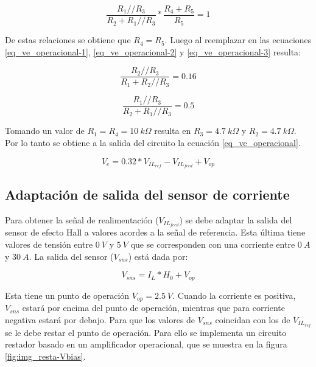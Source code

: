 \begin{equation} \label{eq_ve_operacional-3}
	\frac{R_{1}//R_{3}}{R_{2}+R_{1}//R_{3}}*\frac{R_{4}+R_{5}}{R_{5}} = 1
\end{equation}

De estas relaciones se obtiene que $R_{4}=R_{5}$. Luego al reemplazar en las ecuaciones \ref{eq_ve_operacional-1}, \ref{eq_ve_operacional-2} y \ref{eq_ve_operacional-3} resulta:

\begin{equation*}
	\frac{R_{2}//R_{3}}{R_{1}+R_{2}//R_{3}}= 0.16
\end{equation*}

\begin{equation*}
	\frac{R_{1}//R_{3}}{R_{2}+R_{1}//R_{3}}= 0.5
\end{equation*}

Tomando un valor de $R_{1} = R_{4} = 10\:k\Omega$ resulta en $R_{3}=4.7\:k\Omega$ y $R_{2}=4.7\:k\Omega$. Por lo tanto se obtiene a la salida del circuito la ecuación \ref{eq_ve_operacional}.

\begin{equation} \label{eq_ve_operacional}
	V_e = 0.32 * V_{IL_{ref}} - V_{IL_{feed}} + V_{op}
\end{equation}


\subsection{Adaptación de salida del sensor de corriente}

Para obtener la señal de realimentación ($V_{IL_{feed}}$) se debe adaptar la salida del sensor de efecto Hall a valores acordes a la señal de referencia. Esta última tiene valores de tensión entre $0\:V$ y $5\:V$ que se corresponden con una corriente entre $0\:A$ y $30\:A$. La salida del sensor ($V_{sns}$) está dada por:

\begin{equation}
	V_{sns}=I_L*H_0+V_{op}
\end{equation}

Esta tiene un punto de operación $V_{op}=2.5\:V$. Cuando la corriente es positiva, $V_{sns}$ estará por encima del punto de operación, mientras que para corriente negativa estará por debajo. Para que los valores de $V_{sns}$ coincidan con los de $V_{IL_{ref}}$ se le debe restar el punto de operación. Para ello se implementa un circuito restador basado en un amplificador operacional, que se muestra en la figura \ref{fig:img_resta-Vbias}.

